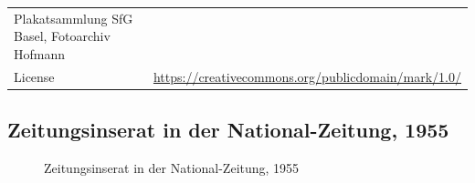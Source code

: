 \documentclass[
  letterpaper,
  DIV=11,
  numbers=noendperiod,
  landscape,
  a4paper,
  geometry:margin=1in]{scrartcl}
\begin{document}
\begin{longtable}[]{@{}
  >{\raggedright\arraybackslash}p{}
  >{\raggedright\arraybackslash}p{}@{}}
Plakatsammlung SfG Basel, Fotoarchiv Hofmann \\
License & \url{https://creativecommons.org/publicdomain/mark/1.0/} \\
\end{longtable}

\subsection{Zeitungsinserat in der National-Zeitung,
1955}\label{zeitungsinserat-in-der-national-zeitung-1955}

\begin{figure}


\caption{\label{fig-zeitungsinserat-in-der-national-zeitung-1955}Zeitungsinserat
in der National-Zeitung, 1955}

\end{figure}%
\end{document}
